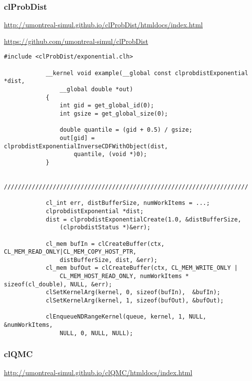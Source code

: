 			\subsubsection{clProbDist}
			\url{http://umontreal-simul.github.io/clProbDist/htmldocs/index.html}
			
			\url{https://github.com/umontreal-simul/clProbDist}
			\begin{lstlisting}[caption=clProbDist Beispiel]
			#include <clProbDist/exponential.clh>                             
                                                                          
			__kernel void example(__global const clprobdistExponential *dist, 
				__global double *out)                       
			{                                                                 
				int gid = get_global_id(0);                                   
				int gsize = get_global_size(0);                               
				
				double quantile = (gid + 0.5) / gsize;                        
				out[gid] = clprobdistExponentialInverseCDFWithObject(dist, 
					quantile, (void *)0); 
			} 
			 
			//////////////////////////////////////////////////////////////////////
			
			cl_int err, distBufferSize, numWorkItems = ...;
			clprobdistExponential *dist;
			dist = clprobdistExponentialCreate(1.0, &distBufferSize, 
				(clprobdistStatus *)&err);    
			
			cl_mem bufIn = clCreateBuffer(ctx, CL_MEM_READ_ONLY|CL_MEM_COPY_HOST_PTR, 
				distBufferSize, dist, &err);
			cl_mem bufOut = clCreateBuffer(ctx, CL_MEM_WRITE_ONLY | 
				CL_MEM_HOST_READ_ONLY, numWorkItems * sizeof(cl_double), NULL, &err);
			clSetKernelArg(kernel, 0, sizeof(bufIn),  &bufIn);
			clSetKernelArg(kernel, 1, sizeof(bufOut), &bufOut);
			
			clEnqueueNDRangeKernel(queue, kernel, 1, NULL, &numWorkItems, 
				NULL, 0, NULL, NULL);		
			\end{lstlisting}
			
			\subsubsection{clQMC}
			\url{http://umontreal-simul.github.io/clQMC/htmldocs/index.html}
			
